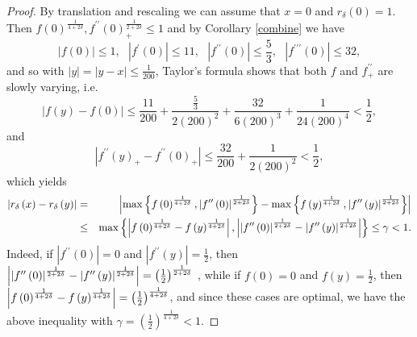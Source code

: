 \documentclass{amsart}
\theoremstyle{plain}
\numberwithin{equation}{section}
\begin{document}
\begin{proof}
By translation and rescaling we can assume that $x=0$ and $r_{\delta }\left(
0\right) =1$. Then $f\left( 0\right) ^{\frac{1}{4+2\delta }},f^{\prime
\prime }\left( 0\right) _{+}^{\frac{1}{2+2\delta }}\leq 1$ and by Corollary %
\ref{combine} we have%
\begin{equation*}
\left\vert f\left( 0\right) \right\vert \leq 1,\ \ \ \left\vert f^{\prime
}\left( 0\right) \right\vert \leq 11,\ \ \ \left\vert f^{\prime \prime
}\left( 0\right) \right\vert \leq \frac{5}{3},\ \ \ \left\vert f^{\prime
\prime \prime }\left( 0\right) \right\vert \leq 32,
\end{equation*}%
and so with $\left\vert y\right\vert =\left\vert y-x\right\vert \leq \frac{1%
}{200}$, Taylor's formula shows that both $f$ and $f_{+}^{\prime \prime }$
are slowly varying, i.e.%
\begin{equation*}
\left\vert f\left( y\right) -f\left( 0\right) \right\vert \leq \frac{11}{200}%
+\frac{\frac{5}{3}}{2\left( 200\right) ^{2}}+\frac{32}{6\left( 200\right)
^{3}}+\frac{1}{24\left( 200\right) ^{4}}<\frac{1}{2},
\end{equation*}%
and%
\begin{equation*}
\left\vert f^{\prime \prime }\left( y\right) _{+}-f^{\prime \prime }\left(
0\right) _{+}\right\vert \leq \frac{32}{200}+\frac{1}{2\left( 200\right) ^{2}%
}<\frac{1}{2},
\end{equation*}%
which yields%
\begin{eqnarray*}
\left\vert r_{\delta }\left( x\right) -r_{\delta }\left( y\right)
\right\vert &=&\left\vert \max \left\{ f\left( 0\right) ^{\frac{1}{4+2\delta 
}},\left\vert f^{\prime \prime }\left( 0\right) \right\vert ^{\frac{1}{%
2+2\delta }}\right\} -\max \left\{ f\left( y\right) ^{\frac{1}{4+2\delta }%
},\left\vert f^{\prime \prime }\left( y\right) \right\vert ^{\frac{1}{%
2+2\delta }}\right\} \right\vert \\
&\leq &\max \left\{ \left\vert f\left( 0\right) ^{\frac{1}{4+2\delta }%
}-f\left( y\right) ^{\frac{1}{4+2\delta }}\right\vert ,\left\vert \left\vert
f^{\prime \prime }\left( 0\right) \right\vert ^{\frac{1}{2+2\delta }%
}-\left\vert f^{\prime \prime }\left( y\right) \right\vert ^{\frac{1}{%
2+2\delta }}\right\vert \right\} \leq \gamma <1.
\end{eqnarray*}%
Indeed, if $\left\vert f^{\prime \prime }\left( 0\right) \right\vert =0$ and 
$\left\vert f^{\prime \prime }\left( y\right) \right\vert =\frac{1}{2}$,
then $\left\vert \left\vert f^{\prime \prime }\left( 0\right) \right\vert ^{%
\frac{1}{2+2\delta }}-\left\vert f^{\prime \prime }\left( y\right)
\right\vert ^{\frac{1}{2+2\delta }}\right\vert =\left( \frac{1}{2}\right) ^{%
\frac{1}{2+2\delta }}$ , while if $f\left( 0\right) =0$ and $f\left(
y\right) =\frac{1}{2}$, then $\left\vert f\left( 0\right) ^{\frac{1}{%
4+2\delta }}-f\left( y\right) ^{\frac{1}{4+2\delta }}\right\vert =\left( 
\frac{1}{2}\right) ^{\frac{1}{4+2\delta }}$, and since these cases are
optimal, we have the above inequality with $\gamma =\left( \frac{1}{2}%
\right) ^{\frac{1}{4+2\delta }}<1$.
\end{proof}
\end{document}
